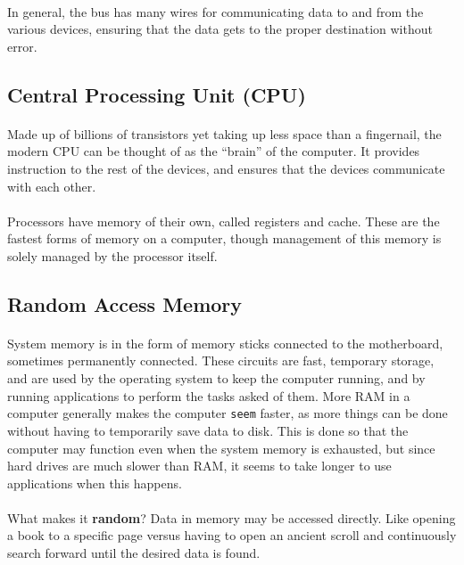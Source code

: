 \documentclass[letter,11pt]{article}
\begin{document}
\paragraph{}In general, the bus has many wires for communicating data to and from the various devices, ensuring that the data gets to the proper destination without error.

\subsection{Central Processing Unit (CPU)}
\paragraph{}Made up of billions of transistors yet taking up less space than a fingernail, the modern CPU can be thought of as the ``brain'' of the computer. It provides instruction to the rest of the devices, and ensures that the devices communicate with each other.

\paragraph{}Processors have memory of their own, called registers and cache. These are the fastest forms of memory on a computer, though management of this memory is solely managed by the processor itself.

\subsection{Random Access Memory}\label{sec:ram}
\paragraph{}System memory is in the form of memory sticks connected to the motherboard, sometimes permanently connected. These circuits are fast, temporary storage, and are used by the operating system to keep the computer running, and by running applications to perform the tasks asked of them. More RAM in a computer generally makes the computer \texttt{seem} faster, as more things can be done without having to temporarily save data to disk. This is done so that the computer may function even when the system memory is exhausted, but since hard drives are much slower than RAM, it seems to take longer to use applications when this happens.

\paragraph{}What makes it \textbf{random}? Data in memory may be accessed directly. Like opening a book to a specific page versus having to open an ancient scroll and continuously search forward until the desired data is found.
\end{document}
